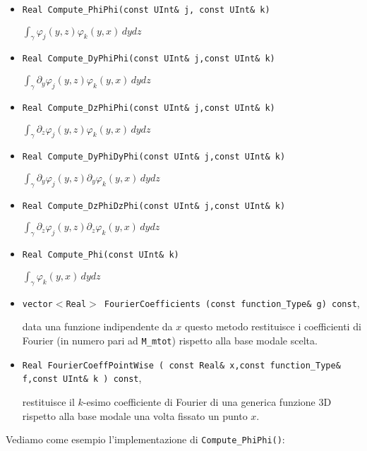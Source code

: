 \begin{itemize}
\item \texttt{Real Compute\_PhiPhi(const UInt\& j, const UInt\& k)}

 $\int_{\gamma}\varphi_j(y,z)\varphi_k(y,x) \,dydz$

\item \texttt{Real Compute\_DyPhiPhi(const UInt\& j,const UInt\& k)} 

$\int_{\gamma} \partial_y \varphi_j(y,z)\varphi_k(y,x) \,dydz$

\item \texttt{Real Compute\_DzPhiPhi(const UInt\& j,const UInt\& k)} 

$\int_{\gamma} \partial_z \varphi_j(y,z)\varphi_k(y,x) \,dydz$

\item \texttt{Real Compute\_DyPhiDyPhi(const UInt\& j,const UInt\& k)} 

$\int_{\gamma} \partial_y \varphi_j(y,z)\partial_y\varphi_k(y,x) \,dydz$

\item \texttt{Real Compute\_DzPhiDzPhi(const UInt\& j,const UInt\& k)} 

$\int_{\gamma} \partial_z \varphi_j(y,z)\partial_z\varphi_k(y,x) \,dydz$

\item \texttt{Real Compute\_Phi(const UInt\& k)} 

$\int_{\gamma} \varphi_k(y,x) \,dydz$

\item \texttt{vector$<$Real$>$ FourierCoefficients (const function\_Type\& g) const},

data una funzione indipendente da $x$ questo metodo restituisce i coefficienti di Fourier (in numero pari ad \texttt{M\_mtot}) rispetto alla base modale scelta.

\item \texttt{Real FourierCoeffPointWise (	const Real\& x,const function\_Type\& f,const UInt\& k ) const},

restituisce il $k$-esimo coefficiente di Fourier di una generica funzione 3D rispetto alla base modale una volta fissato un punto $x$.
\end{itemize}

Vediamo come esempio l'implementazione di \texttt{Compute\_PhiPhi()}:

